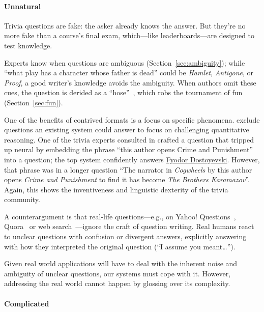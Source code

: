 \paragraph{Unnatural}
\label{sec:unnatural}

Trivia questions are fake: the asker already knows the answer.  
But they're no more fake than a course's final exam, which---like leaderboards---are designed to test knowledge.

Experts know when questions are ambiguous (Section~\ref{sec:ambiguity}); while ``what play has a character whose father is dead'' could be \textit{Hamlet}, \textit{Antigone}, or \textit{Proof}, a good writer's knowledge avoids the ambiguity.
When authors omit these cues, the question is derided as a ``hose''~\citep{2013-eltinge}, which robs the tournament of fun (Section~\ref{sec:fun}).

One of the benefits of contrived formats is a focus on specific phenomena. 
\citet{dua-19} exclude questions an existing  system could answer to focus on challenging quantitative reasoning.
One of the trivia experts consulted in \citet{wallace-19} crafted a question that tripped up neural  by embedding the phrase ``this author opens Crime and Punishment'' into a question; the top system confidently answers \underline{Fyodor Dostoyevski}.
However, that phrase was in a longer question ``The narrator in \textit{Cogwheels} by this author opens \textit{Crime and Punishment} to find it has become \textit{The Brothers Karamazov}''. 
Again, this shows the inventiveness and linguistic dexterity of the trivia community.

A counterargument is that real-life questions---e.g., on Yahoo!
Questions~\citep{szpektor-13}, Quora~\citep{iyer-17} or web
search~\citep{kwiatkowski-19}---ignore the craft of question writing.
Real humans react to unclear questions with confusion or divergent
answers, explicitly answering with how they interpreted the original
question (``I assume you meant\dots'').

Given real world applications will have to deal with the inherent noise and ambiguity of unclear questions, our systems must cope with it. 
However, addressing the real world cannot happen by glossing over its complexity.




\paragraph{Complicated} 

